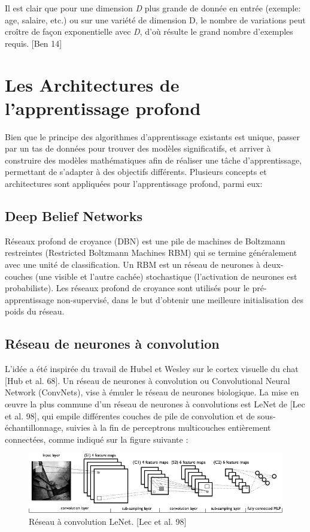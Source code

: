 	Il est clair que pour une dimension \textit{D} plus grande de donnée en entrée (exemple: age, salaire, etc.) ou sur une variété de dimension D, le nombre de variations peut croître de façon exponentielle avec \textit{D}, d'où résulte le grand nombre d'exemples requis. [Ben 14]

\section{Les Architectures de l'apprentissage profond}

	Bien que le principe des algorithmes d'apprentissage existants est unique, passer par un tas de données pour trouver des modèles significatifs, et arriver à construire des modèles mathématiques afin de réaliser une tâche d'apprentissage, permettant de s'adapter à des objectifs différents. Plusieurs concepts et architectures sont appliquées pour l'apprentissage profond, parmi eux:

\subsection{Deep Belief Networks}

	Réseaux profond de croyance (DBN) est une pile de machines de Boltzmann restreintes (Restricted Boltzmann Machines RBM) qui se termine généralement avec une unité de classification. Un RBM est un réseau de neurones à deux-couches (une visible et l'autre cachée) stochastique (l'activation de neurones est probabiliste).
Les réseaux profond de croyance sont utilisés pour le pré-apprentissage non-supervisé, dans le but d'obtenir une meilleure initialisation des poids du réseau.


\subsection{Réseau de neurones à convolution}
	
	L'idée a été inspirée du travail de Hubel et Wesley sur le cortex visuelle du chat [Hub et al. 68]. Un réseau de neurones à convolution ou Convolutional Neural Network (ConvNets), vise à émuler le réseau de neurones biologique.
	La mise en œuvre la plus commune d'un réseau de neurones à convolutions est LeNet de [Lec et al. 98], qui empile différentes couches de pile de convolution et de sous-échantillonnage, suivies à la fin de perceptrons multicouches entièrement connectées, comme indiqué sur la figure suivante :

\begin{figure}[H]
	\centering
		\includegraphics[width=5in]{Figures/Mylenet.png}
	\caption[An Electron]{Réseau à convolution LeNet. [Lec et al. 98]}
	\label{fig:Electron}
\end{figure}

